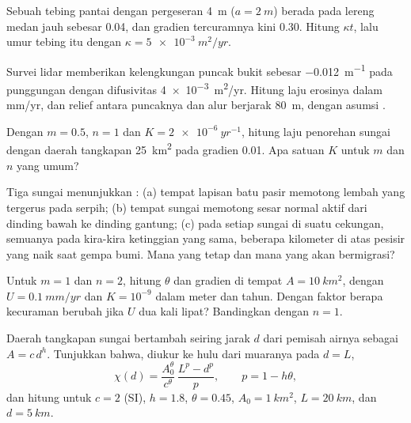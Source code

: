 \begin{exercise}[$\star$]\label{exo:b3:quantitative-geomorphology:1}
Sebuah tebing pantai dengan pergeseran \qty{4}{m} ($a = \qty{2}{m}$) berada pada
lereng medan jauh sebesar 0.04, dan gradien tercuramnya kini 0.30. Hitung
$\kappa t$, lalu umur tebing itu dengan $\kappa = \qty{5e-3}{m^2/yr}$.
\end{exercise}

\begin{exercise}[$\star$]\label{exo:b3:quantitative-geomorphology:2}
Survei lidar memberikan kelengkungan puncak bukit sebesar \qty{-0.012}{m^{-1}} pada punggungan
dengan difusivitas \qty{4e-3}{m^2/yr}. Hitung laju erosinya dalam
\unit{mm/yr}, dan relief antara puncaknya dan alur
berjarak \qty{80}{m}, dengan asumsi .
\end{exercise}

\begin{exercise}[$\star$]\label{exo:b3:quantitative-geomorphology:3}
Dengan $m = 0.5$, $n = 1$ dan $K = \qty{2e-6}{yr^{-1}}$, hitung
laju penorehan sungai dengan daerah tangkapan \qty{25}{km^2} pada gradien 0.01.
Apa satuan $K$ untuk $m$ dan $n$ yang umum?
\end{exercise}

\begin{exercise}[$\star$]\label{exo:b3:quantitative-geomorphology:4}
Tiga sungai menunjukkan : (a) tempat lapisan batu pasir memotong lembah
yang tergerus pada serpih; (b) tempat sungai memotong sesar normal aktif dari
dinding bawah ke dinding gantung; (c) pada setiap sungai di suatu cekungan, semuanya pada kira-kira
ketinggian yang sama, beberapa kilometer di atas pesisir yang naik saat
gempa bumi. Mana yang tetap dan mana yang akan bermigrasi?
\end{exercise}

\begin{exercise}[$\star\star$]\label{exo:b3:quantitative-geomorphology:5}
Untuk $m = 1$ dan $n = 2$, hitung $\theta$ dan gradien  di tempat $A =
\qty{10}{km^2}$, dengan $U = \qty{0.1}{mm/yr}$ dan $K = 10^{-9}$ dalam meter dan
tahun.
Dengan faktor berapa kecuraman berubah jika $U$ dua kali lipat? Bandingkan dengan $n =
1$.
\end{exercise}

\begin{exercise}[$\star\star$]\label{exo:b3:quantitative-geomorphology:6}
Daerah tangkapan sungai bertambah seiring jarak $d$ dari pemisah airnya sebagai $A =
c\,d^{h}$. Tunjukkan bahwa, diukur ke hulu dari muaranya pada $d = L$,
\[
\chi(d) = \frac{A_0^{\theta}}{c^{\theta}}\,\frac{L^{p} - d^{p}}{p},
\qquad p = 1 - h\theta ,
\]
dan hitung untuk $c = 2$ (SI), $h = 1.8$, $\theta = 0.45$, $A_0 =
\qty{1}{km^2}$, $L = \qty{20}{km}$, dan $d = \qty{5}{km}$.
\end{exercise}

